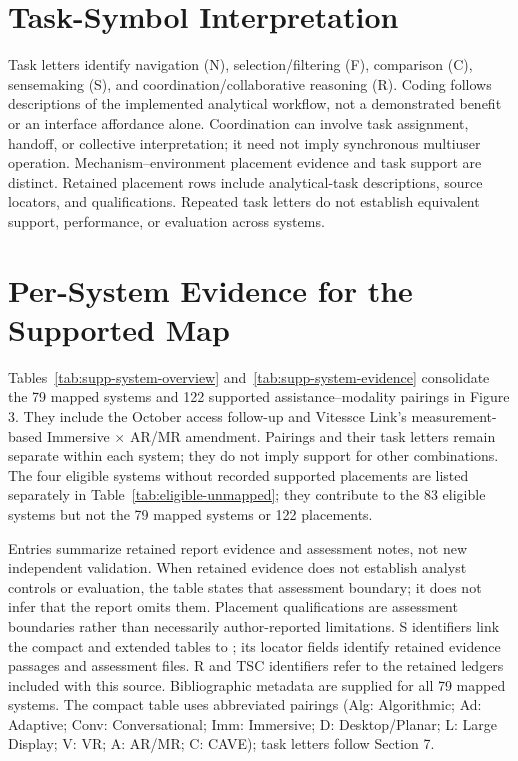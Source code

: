 \documentclass[11pt]{article}
\begin{document}
\section{Task-Symbol Interpretation}
Task letters identify navigation (N), selection/filtering (F), comparison (C), sensemaking (S), and coordination/collaborative reasoning (R). Coding follows descriptions of the implemented analytical workflow, not a demonstrated benefit or an interface affordance alone. Coordination can involve task assignment, handoff, or collective interpretation; it need not imply synchronous multiuser operation. Mechanism--environment placement evidence and task support are distinct. Retained placement rows include analytical-task descriptions, source locators, and qualifications. Repeated task letters do not establish equivalent support, performance, or evaluation across systems.

\clearpage
\section{Per-System Evidence for the Supported Map}
Tables~\ref{tab:supp-system-overview} and~\ref{tab:supp-system-evidence} consolidate the 79 mapped systems and 122 supported assistance--modality pairings in Figure 3. They include the October access follow-up and Vitessce Link's measurement-based Immersive $\times$ AR/MR amendment. Pairings and their task letters remain separate within each system; they do not imply support for other combinations. The four eligible systems without recorded supported placements are listed separately in Table~\ref{tab:eligible-unmapped}; they contribute to the 83 eligible systems but not the 79 mapped systems or 122 placements.

Entries summarize retained report evidence and assessment notes, not new independent validation. When retained evidence does not establish analyst controls or evaluation, the table states that assessment boundary; it does not infer that the report omits them. Placement qualifications are assessment boundaries rather than necessarily author-reported limitations. S identifiers link the compact and extended tables to ; its locator fields identify retained evidence passages and assessment files. R and TSC identifiers refer to the retained ledgers included with this source. Bibliographic metadata are supplied for all 79 mapped systems. The compact table uses abbreviated pairings (Alg: Algorithmic; Ad: Adaptive; Conv: Conversational; Imm: Immersive; D: Desktop/Planar; L: Large Display; V: VR; A: AR/MR; C: CAVE); task letters follow Section 7.
\end{document}
